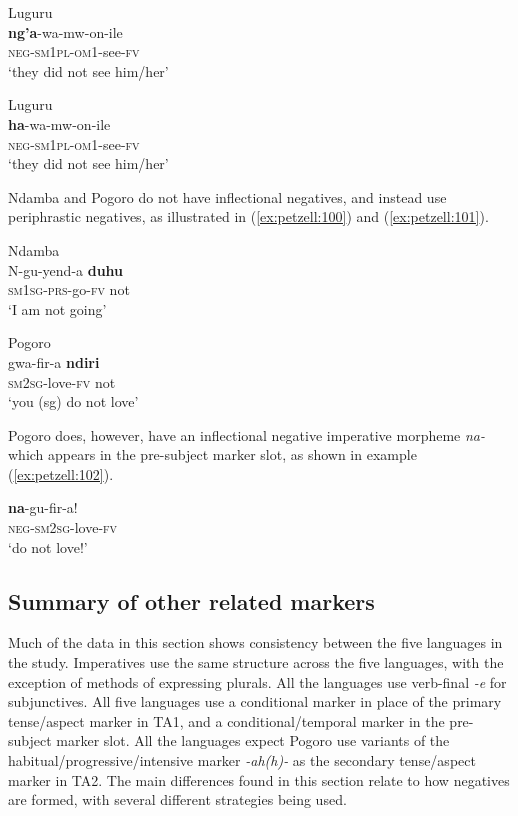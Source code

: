 \documentclass[output=paper,
            colorlinks, citecolor=brown
            ,draftmode
		  ]{langscibook}
\begin{document}
\ea\label{ex:petzell:98}Luguru\\
\gll \textbf{ng'a}{}-wa-mw-on-ile  \\
\textsc{{neg}}{}-\textsc{sm}1\textsc{pl}{}-\textsc{om1}{}-see-\textsc{fv}  \\  
\glt `they did not see him/her{}'


\ex\label{ex:petzell:99}Luguru\\
\gll \textbf{ha}{}-wa-mw-on-ile \\
\textsc{{neg}}{}-\textsc{sm}1\textsc{pl}{}-\textsc{om1}{}-see-\textsc{fv}  \\  
\glt `they did not see him/her{}'
\z


Ndamba and Pogoro do not have inflectional negatives, and instead use periphrastic negatives, as illustrated in  (\ref{ex:petzell:100}) and (\ref{ex:petzell:101}).


\ea\label{ex:petzell:100}Ndamba\\
\gll N-gu-yend-a      \textbf{duhu}\\
\textsc{sm}1\textsc{sg}{}-\textsc{prs}{}-go-\textsc{fv}    {not}\\
\glt `I am not going'


\ex\label{ex:petzell:101}Pogoro\\
\gll gwa-fir-a       \textbf{ndiri} \\
\textsc{sm}2\textsc{sg}{}-love-\textsc{fv}   {not}\\
\glt `you (sg) do not love'
\z


Pogoro does, however, have an inflectional negative imperative morpheme \textit{na-} which appears in the pre-subject marker slot, as shown in example (\ref{ex:petzell:102}).


\ea\label{ex:petzell:102}
\gll \textbf{na}{}-gu-fir-a!\\
\textsc{{neg}}{}-\textsc{sm}\textsc{2}\textsc{sg}{}-love-\textsc{fv}\\
\glt `do not love!'
\z

\subsection{Summary of other related markers}\label{sec:petzell:4.7}

Much of the data in this section shows consistency between the five languages in the study. Imperatives use the same structure across the five languages, with the exception of methods of expressing plurals. All the languages use verb-final \textit{{}-e} for subjunctives. All five languages use a conditional marker in place of the primary tense/aspect marker in TA1, and a conditional/temporal marker in the pre-subject marker slot. All the languages expect Pogoro use variants of the habitual/progressive/intensive marker \textit{{}-ah(h)-} as the secondary tense/aspect marker in TA2. The main differences found in this section relate to how negatives are formed, with several different strategies being used.
\end{document}
